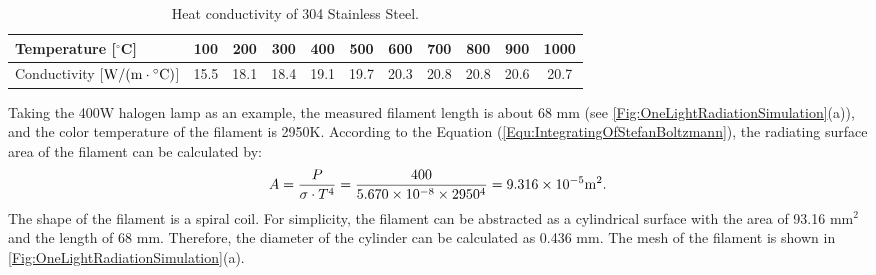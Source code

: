 
\begin{table}[htbp]
  \centering
  \caption{Heat conductivity of 304 Stainless Steel.}
    \begin{tabular}{lcccccccccc}
    \toprule
    Temperature [$^{\circ}$C] & 100   & 200   & 300   & 400   & 500   & 600   & 700   & 800   & 900   & 1000 \\
    \midrule
    Conductivity [${\rm{W/}}({\rm{m}} \cdot {}^ \circ {\rm{C}})$] & 15.5  & 18.1  & 18.4  & 19.1  & 19.7  & 20.3  & 20.8  & 20.8  & 20.6  & 20.7 \\
    \bottomrule
    \end{tabular}%
  \label{Tab:SS304HeatTransfer}%
\end{table}%





Taking the 400W halogen lamp as an example, the measured filament length is about 68 mm (see \ref{Fig:OneLightRadiationSimulation}(a)), and the color temperature of the filament is 2950K. According to the Equation (\ref{Equ:IntegratingOfStefanBoltzmann}), the radiating surface area of the filament can be calculated by:
\begin{equation}
A = \frac{P}{\sigma \cdot T^4} = \frac{400}{5.670\times10^{-8}\times2950^4}=9.316\times10^{-5} {\rm{m }}^2.
\end{equation}
The shape of the filament is a spiral coil. 
For simplicity, the filament can be abstracted as a cylindrical surface with the area of 93.16 mm$^2$ and the length of 68 mm. Therefore, the diameter of the cylinder can be calculated as 0.436 mm. The mesh of the filament is shown in \ref{Fig:OneLightRadiationSimulation}(a).



